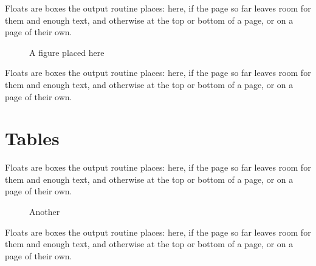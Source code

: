\documentclass{article}
\begin{document}
Floats are boxes the output routine places: here, if the page so far leaves room for them and enough text, and otherwise at the top or bottom of a page, or on a page of their own.

\begin{figure}[h]
\centering
\caption{A figure placed here}
\label{fig:here}
\end{figure}

Floats are boxes the output routine places: here, if the page so far leaves room for them and enough text, and otherwise at the top or bottom of a page, or on a page of their own.

\section{Tables}

\begin{table}[!h]
\caption{A table}\label{tab:one}
\end{table}

Floats are boxes the output routine places: here, if the page so far leaves room for them and enough text, and otherwise at the top or bottom of a page, or on a page of their own.

\begin{figure}[htbp]
\caption{Another}
\end{figure}

Floats are boxes the output routine places: here, if the page so far leaves room for them and enough text, and otherwise at the top or bottom of a page, or on a page of their own.
\end{document}
